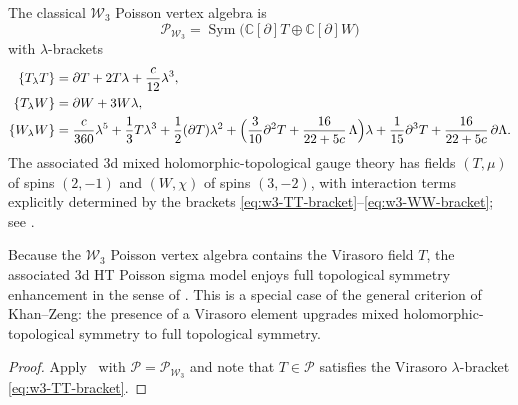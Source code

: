 \begin{example}
\label{ex:w3-classical-pva}
The classical $\mathcal{W}_3$ Poisson vertex algebra is
\begin{equation}\label{eq:w3-pva}
\mathcal{P}_{\mathcal{W}_3}
=
\operatorname{Sym}\!\bigl(\mathbb{C}[\partial]T \oplus \mathbb{C}[\partial]W\bigr)
\end{equation}
with $\lambda$-brackets
\begin{align}
\{T_\lambda T\}
&=
\partial T + 2T\lambda + \frac{c}{12}\lambda^3,
\label{eq:w3-TT-bracket}\\
\{T_\lambda W\}
&=
\partial W + 3W\lambda,
\label{eq:w3-TW-bracket}\\
\{W_\lambda W\}
&=
\frac{c}{360}\lambda^5
+\frac{1}{3}T\lambda^3
+\frac{1}{2}(\partial T)\lambda^2
+\Bigl(\frac{3}{10}\partial^2T+\frac{16}{22+5c}\,\Lambda\Bigr)\lambda
+\frac{1}{15}\partial^3T
+\frac{16}{22+5c}\,\partial\Lambda.
\label{eq:w3-WW-bracket}
\end{align}
The associated 3d mixed holomorphic-topological gauge theory has fields
$(T,\mu)$ of spins $(2,-1)$ and $(W,\chi)$ of spins $(3,-2)$, with
interaction terms explicitly determined by the brackets
\eqref{eq:w3-TT-bracket}--\eqref{eq:w3-WW-bracket}; see
\cite[\S3.4]{KhanZeng25}.
\end{example}

\begin{proposition}
\label{prop:w3-topological-enhancement}
Because the $\mathcal{W}_3$ Poisson vertex algebra contains the
Virasoro field $T$, the associated 3d HT Poisson sigma model enjoys
full topological symmetry enhancement in the sense of
\cite{KhanZeng25}.  This is a special case of the general criterion of
Khan--Zeng: the presence of a Virasoro element upgrades mixed
holomorphic-topological symmetry to full topological symmetry.
\end{proposition}

\begin{proof}
Apply~\cite[Theorem~4.1]{KhanZeng25} with
$\mathcal{P} = \mathcal{P}_{\mathcal{W}_3}$ and note that $T \in
\mathcal{P}$ satisfies the Virasoro $\lambda$-bracket
\eqref{eq:w3-TT-bracket}.
\end{proof}

